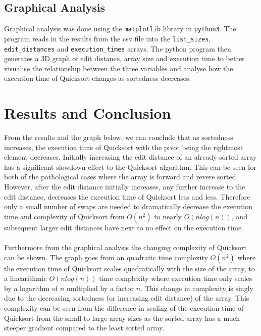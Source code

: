 \documentclass{article}
\begin{document}
\subsection{Graphical Analysis}
Graphical analysis was done using the \verb+matplotlib+ library in \verb+python3+. The program reads in the results from the csv file into the \verb+list_sizes+, \verb+edit_distances+ and \verb+execution_times+ arrays. The python program then generates a 3D graph of edit distance, array size and execution time to better visualise the relationship between the three variables and analyse how the execution time of Quicksort changes as sortedness decreases.
\section{Results and Conclusion}
From the results and the graph below, we can conclude that as sortedness increases, the execution time of Quicksort with the pivot being the rightmost element decreases. Initially increasing the edit distance of an already sorted array has a significant slowdown effect to the Quicksort algorithm. This can be seen for both of the pathological cases where the array is forward and revere sorted. However, after the edit distance initially increases, any further increase to the edit distance, decreases the execution time of Quicksort less and less. Therefore only a small number of swaps are needed to dramatically decrease the execution time and complexity of Quicksort from $O(n^2)$ to nearly $O(nlog(n))$, and subsequent larger edit distances have next to no effect on the execution time.\\ \\
\noindent Furthermore from the graphical analysis the changing complexity of Quicksort can be shown. The graph goes from an quadratic time complexity $O(n^2)$ where the execution time of Quicksort scales quadratically with the size of the array, to a linearithmic  $O(nlog(n))$ time complexity where execution time only scales by a logarithm of $n$ multiplied by a factor $n$. This change in complexity is singly due to the decreasing sortedness (or increasing edit distance) of the array. This complexity can be seen from the difference in scaling of the execution time of Quicksort from the small to large array sizes as the sorted array has a much steeper gradient compared to the least sorted array.
\end{document}
